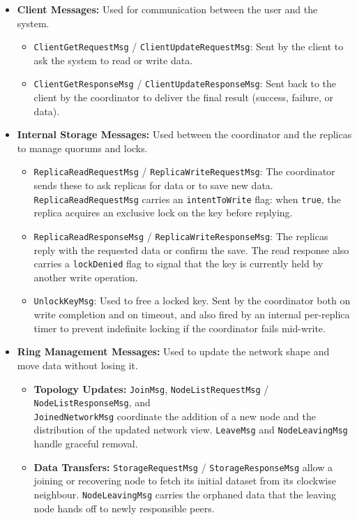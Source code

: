 \begin{itemize}
    \item \textbf{Client Messages:} Used for communication between the user and
        the system.
    \begin{itemize}
        \item \texttt{ClientGetRequestMsg} / \texttt{ClientUpdateRequestMsg}:
            Sent by the client to ask the system to read or write data.
        \item \texttt{ClientGetResponseMsg} / \texttt{ClientUpdateResponseMsg}:
            Sent back to the client by the coordinator to deliver the final
            result (success, failure, or data).
    \end{itemize}

    \item \textbf{Internal Storage Messages:} Used between the coordinator and
        the replicas to manage quorums and locks.
    \begin{itemize}
        \item \texttt{ReplicaReadRequestMsg} / \texttt{ReplicaWriteRequestMsg}:
            The coordinator sends these to ask replicas for data or to save new
            data. \texttt{ReplicaReadRequestMsg} carries an
            \texttt{intentToWrite} flag: when \texttt{true}, the replica
            acquires an exclusive lock on the key before replying.
        \item \texttt{ReplicaReadResponseMsg} /
            \texttt{ReplicaWriteResponseMsg}: The replicas reply with the
            requested data or confirm the save. The read response also carries
            a \texttt{lockDenied} flag to signal that the key is currently
            held by another write operation.
        \item \texttt{UnlockKeyMsg}: Used to free a locked key. Sent by the
            coordinator both on write completion and on timeout, and also fired
            by an internal per-replica timer to prevent indefinite locking if
            the coordinator fails mid-write.
    \end{itemize}

    \item \textbf{Ring Management Messages:} Used to update the network shape
        and move data without losing it.
    \begin{itemize}
        \item \textbf{Topology Updates:} \texttt{JoinMsg},
            \texttt{NodeListRequestMsg} / \texttt{NodeListResponseMsg}, and \\
            \texttt{JoinedNetworkMsg} coordinate the addition of a new node
            and the distribution of the updated network view. \texttt{LeaveMsg}
            and \texttt{NodeLeavingMsg} handle graceful removal.
        \item \textbf{Data Transfers:} \texttt{StorageRequestMsg} /
            \texttt{StorageResponseMsg} allow a joining or recovering node to
            fetch its initial dataset from its clockwise neighbour.
            \texttt{NodeLeavingMsg} carries the orphaned data that the leaving
            node hands off to newly responsible peers.
    \end{itemize}
\end{itemize}

